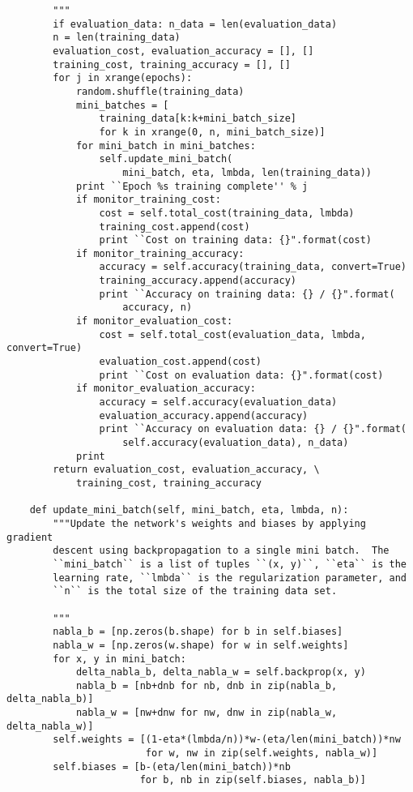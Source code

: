 \begin{lstlisting}
        """
        if evaluation_data: n_data = len(evaluation_data)
        n = len(training_data)
        evaluation_cost, evaluation_accuracy = [], []
        training_cost, training_accuracy = [], []
        for j in xrange(epochs):
            random.shuffle(training_data)
            mini_batches = [
                training_data[k:k+mini_batch_size]
                for k in xrange(0, n, mini_batch_size)]
            for mini_batch in mini_batches:
                self.update_mini_batch(
                    mini_batch, eta, lmbda, len(training_data))
            print ``Epoch %s training complete'' % j
            if monitor_training_cost:
                cost = self.total_cost(training_data, lmbda)
                training_cost.append(cost)
                print ``Cost on training data: {}".format(cost)
            if monitor_training_accuracy:
                accuracy = self.accuracy(training_data, convert=True)
                training_accuracy.append(accuracy)
                print ``Accuracy on training data: {} / {}".format(
                    accuracy, n)
            if monitor_evaluation_cost:
                cost = self.total_cost(evaluation_data, lmbda, convert=True)
                evaluation_cost.append(cost)
                print ``Cost on evaluation data: {}".format(cost)
            if monitor_evaluation_accuracy:
                accuracy = self.accuracy(evaluation_data)
                evaluation_accuracy.append(accuracy)
                print ``Accuracy on evaluation data: {} / {}".format(
                    self.accuracy(evaluation_data), n_data)
            print
        return evaluation_cost, evaluation_accuracy, \
            training_cost, training_accuracy

    def update_mini_batch(self, mini_batch, eta, lmbda, n):
        """Update the network's weights and biases by applying gradient
        descent using backpropagation to a single mini batch.  The
        ``mini_batch`` is a list of tuples ``(x, y)``, ``eta`` is the
        learning rate, ``lmbda`` is the regularization parameter, and
        ``n`` is the total size of the training data set.

        """
        nabla_b = [np.zeros(b.shape) for b in self.biases]
        nabla_w = [np.zeros(w.shape) for w in self.weights]
        for x, y in mini_batch:
            delta_nabla_b, delta_nabla_w = self.backprop(x, y)
            nabla_b = [nb+dnb for nb, dnb in zip(nabla_b, delta_nabla_b)]
            nabla_w = [nw+dnw for nw, dnw in zip(nabla_w, delta_nabla_w)]
        self.weights = [(1-eta*(lmbda/n))*w-(eta/len(mini_batch))*nw
                        for w, nw in zip(self.weights, nabla_w)]
        self.biases = [b-(eta/len(mini_batch))*nb
                       for b, nb in zip(self.biases, nabla_b)]


\end{lstlisting}
